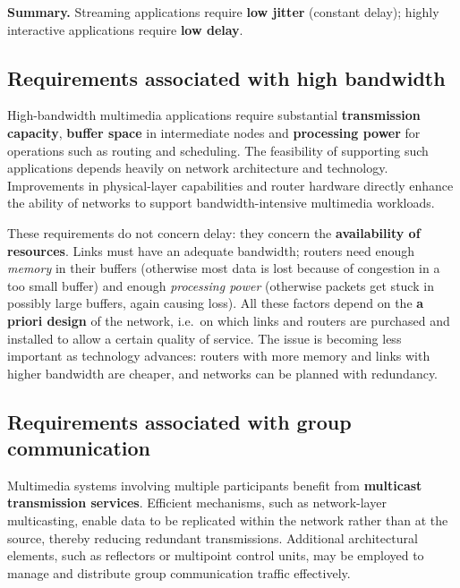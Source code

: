 \begin{notebox}
	\textbf{Summary.} Streaming applications require \textbf{low jitter} (constant delay); highly interactive applications require \textbf{low delay}.
\end{notebox}

\subsection{Requirements associated with high bandwidth}

High-bandwidth multimedia applications require substantial \textbf{transmission capacity}, \textbf{buffer space} in intermediate nodes and \textbf{processing power} for operations such as routing and scheduling. The feasibility of supporting such applications depends heavily on network architecture and technology. Improvements in physical-layer capabilities and router hardware directly enhance the ability of networks to support bandwidth-intensive multimedia workloads.

These requirements do not concern delay: they concern the \textbf{availability of resources}. Links must have an adequate bandwidth; routers need enough \emph{memory} in their buffers (otherwise most data is lost because of congestion in a too small buffer) and enough \emph{processing power} (otherwise packets get stuck in possibly large buffers, again causing loss). All these factors depend on the \textbf{a priori design} of the network, i.e.\ on which links and routers are purchased and installed to allow a certain quality of service. The issue is becoming less important as technology advances: routers with more memory and links with higher bandwidth are cheaper, and networks can be planned with redundancy.

\subsection{Requirements associated with group communication}

Multimedia systems involving multiple participants benefit from \textbf{multicast transmission services}. Efficient mechanisms, such as network-layer multicasting, enable data to be replicated within the network rather than at the source, thereby reducing redundant transmissions. Additional architectural elements, such as reflectors or multipoint control units, may be employed to manage and distribute group communication traffic effectively.

